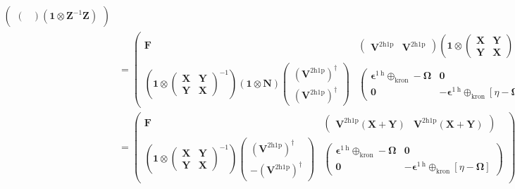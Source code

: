 \begin{align}
\begin{pmatrix}
\begin{pmatrix}
\end{pmatrix} \left(\bm{1} \otimes \bm{Z}^{-1}\bm{Z}\right) \end{pmatrix}\\
&= \begin{pmatrix}\bm{F} & \begin{pmatrix} \bm{V}^{2\mathrm{h1p}} & \bm{V}^{2\mathrm{h1p}}\end{pmatrix} \left(\bm{1} \otimes \begin{pmatrix} \bm{X} & \bm{Y} \\ \bm{Y} & \bm{X} \end{pmatrix}\right) \\
\left(\bm{1} \otimes \begin{pmatrix} \bm{X} & \bm{Y} \\ \bm{Y} & \bm{X} \end{pmatrix}^{-1}\right) \left(\bm{1}\otimes \bm{N} \right)\begin{pmatrix} \left(\bm{V}^{2\mathrm{h1p}}\right)^{\dagger} \\ \left( \bm{V}^{2\mathrm{h1p}}\right)^{\dagger} \end{pmatrix} & \begin{pmatrix}
\bm{\epsilon}^{1 \mathrm{~h}} \oplus_{\text{kron}} -\bm{\Omega} & \bm{0} \\
\bm{0} & -\bm{\epsilon}^{1 \mathrm{~h}}\oplus_{\text{kron}}\left[\eta -\bm{\Omega}\right]
\end{pmatrix} \end{pmatrix} \\
&= \begin{pmatrix}\bm{F} & \begin{pmatrix} \bm{V}^{2\mathrm{h1p}}\left(\bm{X} + \bm{Y}\right) & \bm{V}^{2\mathrm{h1p}}\left(\bm{X} + \bm{Y}\right)\end{pmatrix} \\
 \left(\bm{1} \otimes \begin{pmatrix} \bm{X} & \bm{Y} \\ \bm{Y} & \bm{X} \end{pmatrix}^{-1} \right)\begin{pmatrix} \left(\bm{V}^{2\mathrm{h1p}}\right)^{\dagger} \\ -\left( \bm{V}^{2\mathrm{h1p}}\right)^{\dagger} \end{pmatrix} & \begin{pmatrix}
\bm{\epsilon}^{1 \mathrm{~h}} \oplus_{\text{kron}} -\bm{\Omega} & \bm{0} \\
\bm{0} & -\bm{\epsilon}^{1 \mathrm{~h}} \oplus_{\text{kron}}\left[\eta -\bm{\Omega}\right]
\end{pmatrix}
\end{pmatrix}
\end{align}
